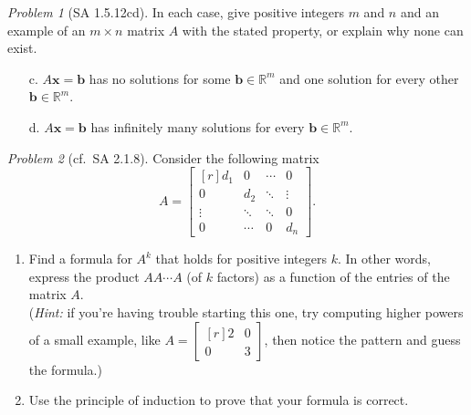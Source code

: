 \documentclass[fleqn,11pt]{paper}
\theoremstyle{remark}
\newtheorem{problem}{Problem}
\newcommand\R{\mathbb{R}}
\renewcommand{\vec}[1]{\mathbf{#1}}
\newcommand\vb{\vec{b}}
\newcommand\vx{\vec{x}}
\begin{document}
\newpage

\begin{problem}[SA 1.5.12cd]
  In each case, give positive integers $m$ and $n$ and an example of an
  $m \times n$ matrix $A$ with the stated property, or explain why none can exist.
  \begin{itemize}
  \item[c.] $A\vx = \vb$ has no solutions for some $\vb \in \R^m$ and one solution
    for every other $\vb\in \R^m$.
  \item[d.] $A\vx = \vb$ has infinitely many solutions for every $\vb \in \R^m$. 
  \end{itemize}
\end{problem}

\newpage




\begin{problem}[cf.~SA 2.1.8]
Consider the following matrix 
  \[
  A = \begin{bmatrix*}[r]
    d_1     & 0      & \cdots & 0      \\
    0       & d_2    & \ddots & \vdots \\
    \vdots  & \ddots &\ddots&    0      \\
    0       & \cdots &    0  & d_n
  \end{bmatrix*}.
  \]
\begin{enumerate}[{\bf a.}]
\item 
Find a formula for $A^k$ that holds for positive integers $k$. 
In other words, express the product $AA\cdots A$ (of $k$ factors)
as a function of the entries of the matrix $A$.\\
({\it Hint:} if you're having trouble starting this one, try computing 
higher powers of a small example, like $A = \begin{bmatrix*}[r] 2 & 0\\ 0 & 3\end{bmatrix*}$,
then notice the pattern and guess the formula.)
\item Use the principle of induction to prove that your formula is correct.
\end{enumerate}
\end{problem}
\end{document}
